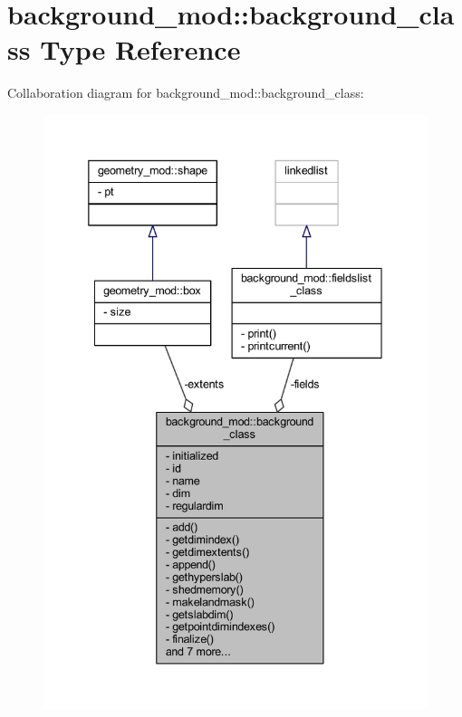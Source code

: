 \hypertarget{structbackground__mod_1_1background__class}{}\section{background\+\_\+mod\+:\+:background\+\_\+class Type Reference}
\label{structbackground__mod_1_1background__class}


Collaboration diagram for background\+\_\+mod\+:\+:background\+\_\+class\+:
\nopagebreak
\begin{figure}[H]
\begin{center}
\leavevmode
\includegraphics[width=339pt]{structbackground__mod_1_1background__class__coll__graph}
\end{center}
\end{figure}
